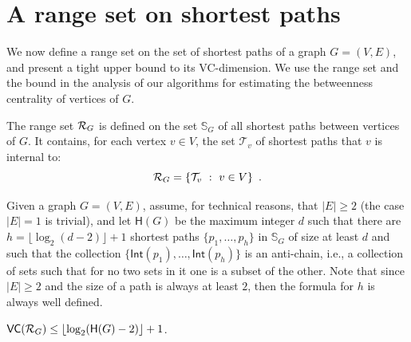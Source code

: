 \section{A range set on shortest paths}\label{sec:rangeset}
We now define a range set on the set of shortest paths of a graph $G=(V,E)$, and present 
a tight upper bound to its VC-dimension. We use the range set and the bound in
the analysis of our algorithms for estimating the betweenness centrality of
vertices of $G$.

The range set $\mathcal{R}_G$ is defined on the set $\mathbb{S}_G$ of all shortest
paths between vertices of $G$. It contains, for each vertex $v\in V$, the set
$\mathcal{T}_v$ of shortest paths that $v$ is internal to:
\[
\mathcal{R}_G = \{\mathcal{T}_v ~:~ v\in V\}\enspace.
\]

Given a graph $G=(V,E)$, assume, for technical reasons, that $|E|\ge 2$ (the
case $|E|=1$ is trivial), and let $\mathsf{H}(G)$ be the maximum integer $d$
such that there are $h=\lfloor\log_2(d-2)\rfloor+1$ shortest paths
$\{p_1,\dotsc,p_h\}$ in $\mathbb{S}_G$ of size at least $d$ and such that the
collection $\{\mathsf{Int}(p_1),\dotsc,\mathsf{Int}(p_h)\}$ is an anti-chain,
i.e., a collection of sets such that for no two sets in it one is a subset of
the other. Note that since $|E|\ge 2$ and the size of a path is always at least
$2$, then the formula for $h$ is always well defined.



\begin{lemma}\label{lem:vcdimuppbound}
  $\mathsf{VC}(\mathcal{R}_G)\le\lfloor\log_2(\mathsf{H}(G)-2)\rfloor+1$.
\end{lemma}

